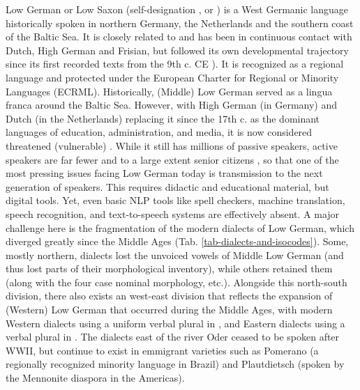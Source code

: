 Low German or Low Saxon (self-designation ,  or ) is a West Germanic language historically spoken in northern Germany, the Netherlands and the southern coast of the Baltic Sea. It is closely related to and has been in continuous contact with Dutch, High German and Frisian, but followed its own developmental trajectory since its first recorded texts from the 9th c. CE \cite{price-2010-heliand-phd}). It is recognized as a regional language and protected under the European Charter for Regional or Minority Languages (ECRML). 
Historically, (Middle) Low German served as a lingua franca around the Baltic Sea. However, with High German (in Germany) and Dutch (in the Netherlands) replacing it since the 17th c. as the dominant languages of education, administration, and media, it is now considered threatened (vulnerable) \cite[p.25]{moseley2010atlas}. While it still has millions of passive speakers, active speakers are far fewer and to a large extent senior citizens \cite{AdlerEhlersGoltzetal.2019}, so that one of the most pressing issues facing Low German today is transmission to the next generation of speakers. This requires didactic and educational material, but digital tools. Yet, even basic NLP tools like spell checkers, machine translation, speech recognition, and text-to-speech systems are effectively absent. A major challenge here is the fragmentation of the modern dialects of Low German, which diverged greatly since the Middle Ages (Tab. \ref{tab-dialects-and-isocodes}). Some, mostly northern, dialects lost the unvoiced vowels of Middle Low German (and thus lost parts of their morphological inventory), while others retained them (along with the four case nominal morphology, etc.). Alongside this north-south division, there also exists an west-east division that reflects the expansion of (Western) Low German that occurred during the Middle Ages, with modern Western dialects using a uniform verbal plural in , and Eastern dialects using a verbal plural in . The dialects east of the river Oder ceased to be spoken after WWII, but continue to exist in emmigrant varieties such as Pomerano (a regionally recognized minority language in Brazil) and Plautdietsch (spoken by the Mennonite diaspora in the Americas).

